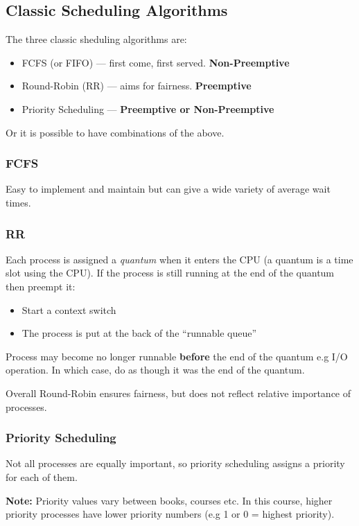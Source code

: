 \documentclass{article}%
\begin{document}
\subsection{Classic Scheduling Algorithms}
The three classic sheduling algorithms are:
\begin{itemize}
	\item FCFS (or FIFO) --- first come, first served. \textbf{Non-Preemptive}
	\item Round-Robin (RR) --- aims for fairness. \textbf{Preemptive}
	\item Priority Scheduling --- \textbf{Preemptive or Non-Preemptive}
\end{itemize}
Or it is possible to have combinations of the above.

\subsubsection{FCFS}
Easy to implement and maintain but can give a wide variety of average wait times.

\subsubsection{RR}
Each process is assigned a \textit{quantum} when it enters the CPU (a quantum is a time slot using the CPU).
If the process is still running at the end of the quantum then preempt it:
\begin{itemize}
	\item Start a context switch
	\item The process is put at the back of the ``runnable queue''
\end{itemize}
Process may become no longer runnable \textbf{before} the end of the quantum e.g I/O operation.
In which case, do as though it was the end of the quantum.

Overall Round-Robin ensures fairness, but does not reflect relative importance of processes.

\subsubsection{Priority Scheduling}
Not all processes are equally important, so priority scheduling assigns a priority for each of them.

\medskip
\textbf{Note:} Priority values vary between books, courses etc.
In this course, higher priority processes have lower priority numbers (e.g 1 or 0 = highest priority).
\end{document}
